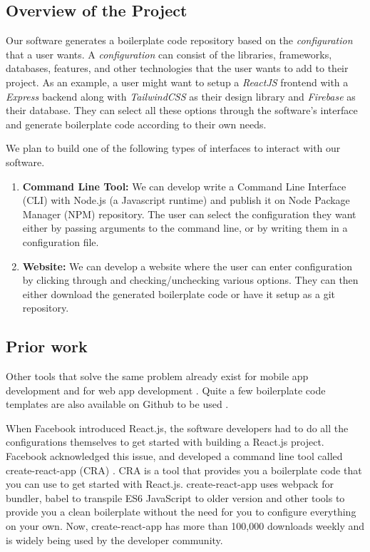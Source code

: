 \subsection{Overview of the Project}

Our software generates a boilerplate code repository based on the \emph{configuration} that a user wants. A \emph{configuration} can consist of the libraries, frameworks, databases, features, and other technologies that the user wants to add to their project. As an example, a user might want to setup a \emph{ReactJS} frontend with a \emph{Express} backend along with \emph{TailwindCSS} as their design library and \emph{Firebase} as their database. They can select all these options through the software's interface and generate boilerplate code according to their own needs.

We plan to build one of the following types of interfaces to interact with our software.
\begin{enumerate}
  \item \textbf{Command Line Tool:} We can develop write a Command Line Interface (CLI) with Node.js (a Javascript runtime) and publish it on Node Package Manager (NPM) repository. The user can select the configuration they want either by passing arguments to the command line, or by writing them in a configuration file.
  \item \textbf{Website:} We can develop a website where the user can enter configuration by clicking through and checking/unchecking various options. They can then either download the generated boilerplate code or have it setup as a git repository.
\end{enumerate}

\subsection{Prior work}

Other tools that solve the same problem already exist for mobile app development \cite{barnett2015bootstrapping} and for web app development \cite{inayatullah2019model}. Quite a few boilerplate code templates are also available on Github to be used \cite{msaaddev}.

When Facebook introduced React.js, the software developers had to do all the configurations themselves to get started with building a React.js project. Facebook acknowledged this issue, and developed a command line tool called create-react-app (CRA) \cite{create-react-app}. CRA is a tool that provides you a boilerplate code that you can use to get started with React.js.  create-react-app uses webpack for bundler, babel to transpile ES6 JavaScript to older version and other tools to provide you a clean boilerplate without the need for you to configure everything on your own. Now, create-react-app has more than 100,000 downloads weekly and is widely being used by the developer community.

